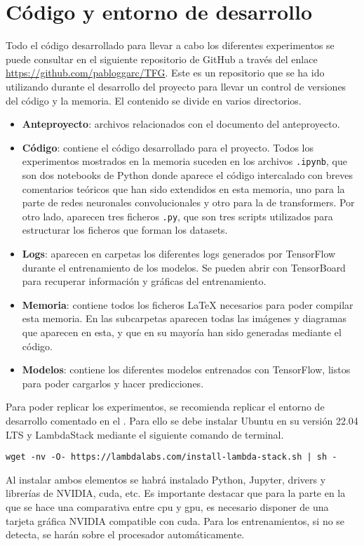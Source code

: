 \chapter{Código y entorno de desarrollo}

	Todo el código desarrollado para llevar a cabo los diferentes experimentos se puede consultar en el siguiente repositorio de GitHub a través del enlace \url{https://github.com/pabloggarc/TFG}. Este es un repositorio que se ha ido utilizando durante el desarrollo del proyecto para llevar un control de versiones del código y la memoria. El contenido se divide en varios directorios. 
	
	\begin{itemize}
		\item \textbf{Anteproyecto}: archivos relacionados con el documento del anteproyecto. 
		\item \textbf{Código}: contiene el código desarrollado para el proyecto. Todos los experimentos mostrados en la memoria suceden en los archivos \texttt{.ipynb}, que son dos notebooks de Python donde aparece el código intercalado con breves comentarios teóricos que han sido extendidos en esta memoria, uno para la parte de redes neuronales convolucionales y otro para la de transformers. Por otro lado, aparecen tres ficheros \texttt{.py}, que son tres scripts utilizados para estructurar los ficheros que forman los datasets. 
		\item \textbf{Logs}: aparecen en carpetas los diferentes logs generados por TensorFlow durante el entrenamiento de los modelos. Se pueden abrir con TensorBoard para recuperar información y gráficas del entrenamiento. 
		\item \textbf{Memoria}: contiene todos los ficheros \LaTeX{} necesarios para poder compilar esta memoria. En las subcarpetas aparecen todas las imágenes y diagramas que aparecen en esta, y que en su mayoría han sido generadas mediante el código. 
		\item \textbf{Modelos}: contiene los diferentes modelos entrenados con TensorFlow, listos para poder cargarlos y hacer predicciones. 
	\end{itemize}
	
	Para poder replicar los experimentos, se recomienda replicar el entorno de desarrollo comentado en el . Para ello se debe instalar Ubuntu en su versión 22.04 LTS y LambdaStack mediante el siguiente comando de terminal. 
	\begin{center}
		\begin{BVerbatim}[tabsize = 0]
			wget -nv -O- https://lambdalabs.com/install-lambda-stack.sh | sh -
		\end{BVerbatim}
	\end{center}
	Al instalar ambos elementos se habrá instalado Python, Jupyter, drivers y librerías de NVIDIA, \gls{cuda}, etc. Es importante destacar que para la parte en la que se hace una comparativa entre \gls{cpu} y \gls{gpu}, es necesario disponer de una tarjeta gráfica NVIDIA compatible con \gls{cuda}. Para los entrenamientos, si no se detecta, se harán sobre el procesador automáticamente. \\
	

